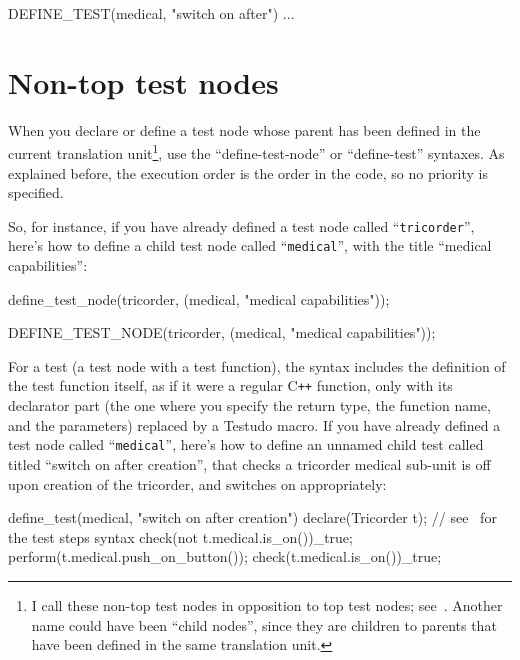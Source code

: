 \documentclass[twoside, a4paper, article]{memoir}
\newcommand*\Cpp{C\texttt{++}}
\begin{document}
\begin{cpplisting}
DEFINE_TEST(medical, "switch on after")
{
  ...
}
\end{cpplisting}


\section{Non-top test nodes}
\label{sec:non-top-test-nodes}

When you declare or define a test node whose parent has been defined in the
current translation unit\footnote{I call these non-top test nodes in opposition
  to top test nodes; see~.  Another name could have
  been ``child nodes'', since they are children to parents that have been
  defined in the same translation unit.}, use the ``define-test-node'' or
``define-test'' syntaxes.  As explained before, the execution order is the
order in the code, so no priority is specified.

So, for instance, if you have already defined a test node called
``\texttt{tricorder}'', here's how to define a child test node called
``\texttt{medical}'', with the title ``medical capabilities'':
\begin{cpplisting}
define_test_node(tricorder,
                 (medical, "medical capabilities"));
\end{cpplisting}

\begin{cpplisting}
DEFINE_TEST_NODE(tricorder,
                 (medical, "medical capabilities"));
\end{cpplisting}

For a test (a test node with a test function), the syntax includes the
definition of the test function itself, as if it were a regular \Cpp{}
function, only with its declarator part (the one where you specify the return
type, the function name, and the parameters) replaced by a Testudo macro.  If
you have already defined a test node called ``\texttt{medical}'', here's how to
define an unnamed child test called titled ``switch on after creation'', that
checks a tricorder medical sub-unit is off upon creation of the tricorder, and
switches on appropriately:
\begin{cpplisting}
define_test(medical, "switch on after creation") {
  declare(Tricorder t); // see~ for the test steps syntax
  check(not t.medical.is_on())_true;
  perform(t.medical.push_on_button());
  check(t.medical.is_on())_true;
}
\end{cpplisting}
\end{document}
